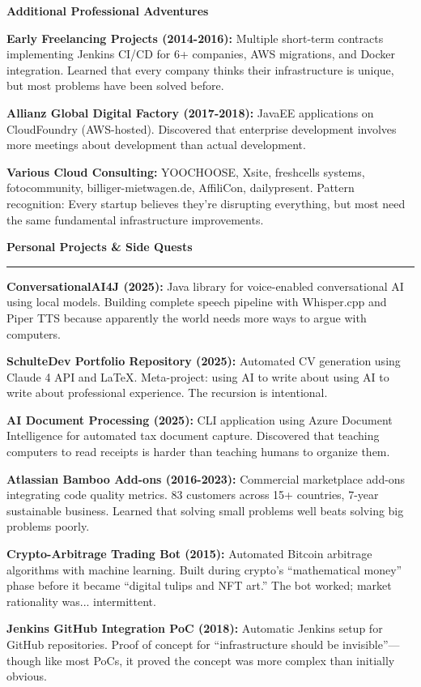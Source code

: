 \documentclass[11pt,a4paper]{article}
\newcommand{\sectionheader}[1]{
    \vspace{0.4em}
    {\Large \textbf{\textsf{\textcolor{primarycolor}{#1}}}}
    \vspace{0.2em}
    \hrule
    \vspace{0.3em}
}
\newcommand{\subsectionheader}[1]{
    \vspace{0.2em}
    {\large \textbf{\textsf{#1}}}
    \vspace{0.1em}
}
\begin{document}
\subsectionheader{Additional Professional Adventures}

\textbf{Early Freelancing Projects (2014-2016):} Multiple short-term contracts implementing Jenkins CI/CD for 6+ companies, AWS migrations, and Docker integration. Learned that every company thinks their infrastructure is unique, but most problems have been solved before.

\textbf{Allianz Global Digital Factory (2017-2018):} JavaEE applications on CloudFoundry (AWS-hosted). Discovered that enterprise development involves more meetings about development than actual development.

\textbf{Various Cloud Consulting:} YOOCHOOSE, Xsite, freshcells systems, fotocommunity, billiger-mietwagen.de, AffiliCon, dailypresent. Pattern recognition: Every startup believes they're disrupting everything, but most need the same fundamental infrastructure improvements.

\sectionheader{Personal Projects \& Side Quests}

\textbf{ConversationalAI4J (2025):} Java library for voice-enabled conversational AI using local models. Building complete speech pipeline with Whisper.cpp and Piper TTS because apparently the world needs more ways to argue with computers.

\textbf{SchulteDev Portfolio Repository (2025):} Automated CV generation using Claude 4 API and LaTeX. Meta-project: using AI to write about using AI to write about professional experience. The recursion is intentional.

\textbf{AI Document Processing (2025):} CLI application using Azure Document Intelligence for automated tax document capture. Discovered that teaching computers to read receipts is harder than teaching humans to organize them.

\textbf{Atlassian Bamboo Add-ons (2016-2023):} Commercial marketplace add-ons integrating code quality metrics. 83 customers across 15+ countries, 7-year sustainable business. Learned that solving small problems well beats solving big problems poorly.

\textbf{Crypto-Arbitrage Trading Bot (2015):} Automated Bitcoin arbitrage algorithms with machine learning. Built during crypto's ``mathematical money'' phase before it became ``digital tulips and NFT art.'' The bot worked; market rationality was... intermittent.

\textbf{Jenkins \textrightarrow{} GitHub Integration PoC (2018):} Automatic Jenkins setup for GitHub repositories. Proof of concept for ``infrastructure should be invisible''---though like most PoCs, it proved the concept was more complex than initially obvious.
\end{document}
